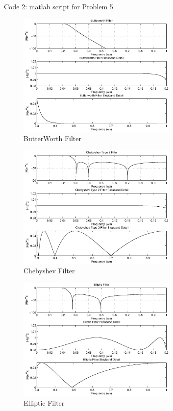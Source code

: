 \begin{homeworkProblem}
\begin{center}
{Code 2: matlab script for Problem 5}
\end{center}

\begin{figure}[!htbp]
  \centering
    \includegraphics[width=0.7\textwidth]{Figures/PS9-5-1.eps}
  \caption{ButterWorth Filter}
\end{figure}

\begin{figure}[!htbp]
  \centering
    \includegraphics[width=0.7\textwidth]{Figures/PS9-5-2.eps}
  \caption{Chebyshev Filter}
\end{figure}

\begin{figure}[!htbp]
  \centering
    \includegraphics[width=0.7\textwidth]{Figures/PS9-5-3.eps}
  \caption{Elliptic Filter}
\end{figure}


\end{homeworkProblem}
